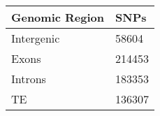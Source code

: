 \documentclass[12pt, a5paper]{article}
\begin{document}
\begin{table}[ht]
\centering
\begin{tabular}{ll}
  \hline
Genomic Region & SNPs \\ 
  \hline
Intergenic & 58604 \\ 
  Exons & 214453 \\ 
  Introns & 183353 \\ 
  TE & 136307 \\ 
   \hline
\end{tabular}
\end{table}
\end{document}
